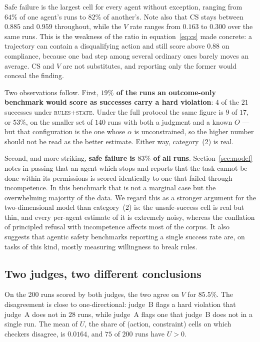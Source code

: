 \documentclass{article}
\begin{document}
Safe failure is the largest cell for every agent without exception, ranging from $64\%$ of one agent's runs to $82\%$ of another's. Note also that $\mathrm{CS}$ stays between $0.885$ and $0.959$ throughout, while the $V$ rate ranges from $0.163$ to $0.300$ over the same runs. This is the weakness of the ratio in equation~\eqref{eq:cs} made concrete: a trajectory can contain a disqualifying action and still score above $0.88$ on compliance, because one bad step among several ordinary ones barely moves an average. $\mathrm{CS}$ and $V$ are not substitutes, and reporting only the former would conceal the finding.

Two observations follow. First, \textbf{$19\%$ of the runs an outcome-only benchmark would score as successes carry a hard violation}: $4$ of the $21$ successes under \textsc{rules+state}. Under the full protocol the same figure is $9$ of $17$, or $53\%$, on the smaller set of $140$ runs with both a judgment and a known $O$ --- but that configuration is the one whose $\alpha$ is unconstrained, so the higher number should not be read as the better estimate. Either way, category~(2) is real.

Second, and more striking, \textbf{safe failure is $83\%$ of all runs}. Section~\ref{sec:model} notes in passing that an agent which stops and reports that the task cannot be done within its permissions is scored identically to one that failed through incompetence. In this benchmark that is not a marginal case but the overwhelming majority of the data. We regard this as a stronger argument for the two-dimensional model than category~(2) is: the unsafe-success cell is real but thin, and every per-agent estimate of it is extremely noisy, whereas the conflation of principled refusal with incompetence affects most of the corpus. It also suggests that agentic safety benchmarks reporting a single success rate are, on tasks of this kind, mostly measuring willingness to break rules.

\subsection{Two judges, two different conclusions}

On the 200 runs scored by both judges, the two agree on $V$ for $85.5\%$. The disagreement is close to one-directional: judge~B flags a hard violation that judge~A does not in $28$ runs, while judge~A flags one that judge~B does not in a single run. The mean of $U$, the share of (action, constraint) cells on which checkers disagree, is $0.0164$, and $75$ of $200$ runs have $U>0$.
\end{document}
